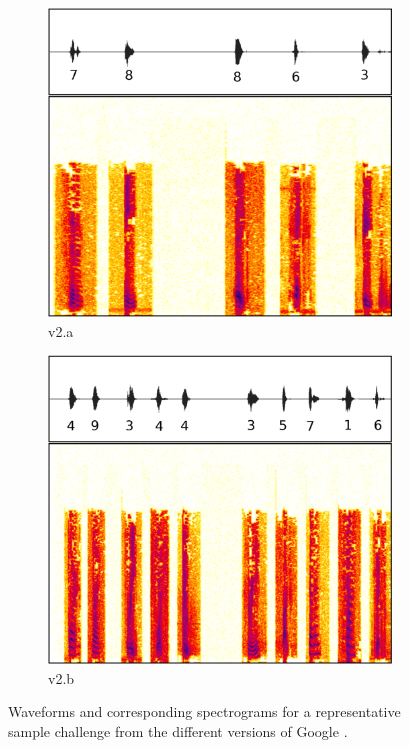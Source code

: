 \begin{figure}[tp]
\begin{subfigure}{0.23\textwidth}
        \includegraphics[width=\textwidth]{figures/recaptcha2a.pdf}
        \caption{\re v2.a}
        \label{fig:recaptcha2a}
\end{subfigure}\hspace{0.01\textwidth}
\begin{subfigure}{0.23\textwidth}
        \includegraphics[width=\textwidth]{figures/recaptcha2b.pdf}
        \caption{\re v2.b}
        \label{fig:recaptcha2b}
\end{subfigure}
\caption{Waveforms and corresponding spectrograms for a representative sample challenge from the different versions of Google \re.}
\label{fig:examples}
\end{figure}

